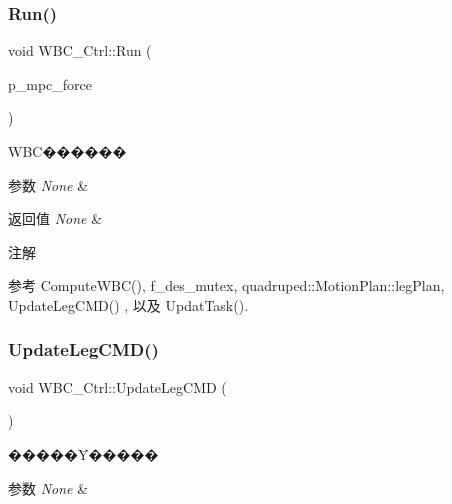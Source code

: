\subsubsection{\texorpdfstring{Run()}{Run()}}
{\footnotesize\ttfamily void W\+B\+C\+\_\+\+Ctrl\+::\+Run (\begin{DoxyParamCaption}\item[{\hyperlink{cppTypes_8h_a87f228860242acc66da2e58086d18cec}{Vec12}$<$ double $>$ \&}]{p\+\_\+mpc\+\_\+force }\end{DoxyParamCaption})}



W\+B\+C������ 


\begin{DoxyParams}{参数}
{\em None} & \\
\hline
\end{DoxyParams}

\begin{DoxyRetVals}{返回值}
{\em None} & \\
\hline
\end{DoxyRetVals}
\begin{DoxyNote}{注解}

\end{DoxyNote}


参考 Compute\+W\+B\+C(), f\+\_\+des\+\_\+mutex, quadruped\+::\+Motion\+Plan\+::leg\+Plan, Update\+Leg\+C\+M\+D() , 以及 Updat\+Task().

\mbox{\label{classquadruped_1_1WBC__Ctrl_a2ec34349523dc12b29bf0a19ff5e6e53}} 
\subsubsection{\texorpdfstring{Update\+Leg\+C\+M\+D()}{UpdateLegCMD()}}
{\footnotesize\ttfamily void W\+B\+C\+\_\+\+Ctrl\+::\+Update\+Leg\+C\+MD (\begin{DoxyParamCaption}\item[{void}]{ }\end{DoxyParamCaption})}



�����Ȳ����� 


\begin{DoxyParams}{参数}
{\em None} & \\
\hline
\end{DoxyParams}

